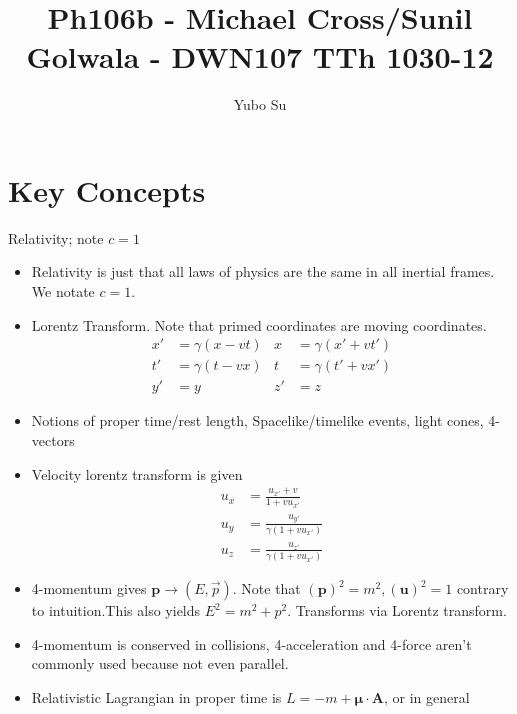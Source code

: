 \documentclass[10pt]{report}
\begin{document}
\pagestyle{fancy}

\title{Ph106b - Michael Cross/Sunil Golwala - DWN107 TTh 1030-12}
\author{Yubo Su}
\date{ }

\maketitle

\tableofcontents

\chapter{Key Concepts}

Relativity; note $c=1$

\begin{itemize}
    \item Relativity is just that all laws of physics are the same in all inertial frames. We notate $c=1$.
    \item Lorentz Transform. Note that primed coordinates are moving coordinates.
        \begin{align*}
            x' &= \gamma(x-vt) & x &= \gamma(x' + vt')\\
            t' &= \gamma(t-vx) & t &= \gamma(t' + vx')\\
            y' &= y & z' &= z
        \end{align*}
    \item Notions of proper time/rest length, Spacelike/timelike events, light cones, 4-vectors
    \item Velocity lorentz transform is given
        \begin{align*}
            u_x &= \frac{u_{x'} + v}{1+vu_{x'}}\\
            u_y &= \frac{u_{y'}}{\gamma(1+vu_{x'})}\\
            u_z &= \frac{u_{z'}}{\gamma(1+vu_{x'})}
        \end{align*}
    \item 4-momentum gives $\mathbf{p} \to (E,\vec{p})$. Note that $(\mathbf{p})^2 = m^2, (\mathbf{u})^2 = 1$ contrary to intuition.This also yields $E^2 = m^2 + p^2$. Transforms via Lorentz transform.
    \item 4-momentum is conserved in collisions, 4-acceleration and 4-force aren't commonly used because not even parallel.
    \item Relativistic Lagrangian in proper time is $L = -m + \mathbf{\mu}\cdot \mathbf{A}$, or in general

\end{itemize}
\end{document}
